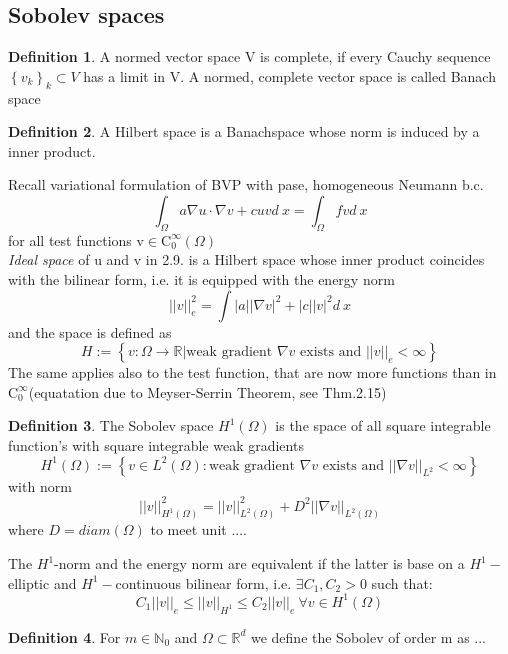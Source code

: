 \documentclass[english]{article}
\theoremstyle{definition}
\newtheorem*{defi}{Definition}
\theoremstyle{remark}
\newcommand{\NN}{\mathbb{N}}			%
\newcommand{\RR}{\mathbb{R}}			%
\newcommand{\OO}{\Omega}
\newcommand{\cinf}{\tx{C}^\infty}
\newcommand{\tri}{\nabla}
\newcommand{\tx}[1]{\text{#1}}
\begin{document}
\subsection{Sobolev spaces}
\begin{defi}
  A normed vector space V is complete, if every Cauchy sequence $\left\{ v_k \right\}_k \subset V$ has a limit in V. A normed, complete vector space is called Banach space\end{defi}
\begin{defi}
  A Hilbert space is a Banachspace whose norm is induced by a inner product.\end{defi}
Recall variational formulation of BVP with pase, homogeneous Neumann b.c.
$$\int_\OO a \tri u \cdot \tri v + cuv d\ x = \int_\OO fv d\ x$$
for all test functions v$\in \cinf _0(\OO)$\\
\emph{Ideal space} of u and v in 2.9. is a Hilbert space whose inner product coincides with the bilinear form, i.e. it is equipped with the energy norm
$$||v||_e ^2 = \int |a||\tri v |^2 +|c||v|^2 d\ x $$
and the space is defined as 
$$ H:= \left\{v : \OO \to \RR | \tx{weak gradient }\tri v \tx{ exists and } ||v||_e <\infty \right\}$$
The same applies also to the test function, that are now more functions than in $\cinf_0$(equatation due to Meyser-Serrin Theorem, see Thm.2.15)
\begin{defi}
  The Sobolev space $H^1(\OO)$ is the space of all square integrable function's with square integrable weak gradients
  $$H^1(\OO) := \left\{v\in L^2(\OO) : \tx{weak gradient }\tri v \tx{ exists and } ||\tri v||_{L^2} <\infty \right\}$$
  with norm $$||v||^2 _{H^1(\OO)} = ||v||^2 _{L^2(\OO)} + D^2 ||\tri v||_{L^2(\OO)}$$
  where $D= diam (\OO)$ to meet unit ....


  The $H^1$-norm and the energy norm are equivalent if the latter is base on a $H^1-$elliptic and $H^1-$continuous bilinear form, i.e. $\exists C_1,C_2>0$ such that:
  $$C_1 ||v||_e \leq ||v||_{H^1 }\leq C_2||v||_e \ \forall v \in H^1(\OO)$$
\end{defi}
\begin{defi} For $m \in \NN_0$ and $\OO\subset \RR^d$ we define the Sobolev of order m as ...
\end{defi}
\end{document}
